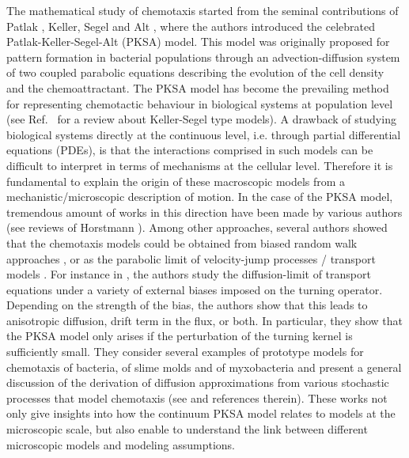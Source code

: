 \documentclass{article}
\begin{document}
{The mathematical study of chemotaxis started from the seminal contributions of Patlak \cite{patlak1953random}, Keller, Segel and Alt \cite{keller1970initiation,keller1971model,Alt1980}, where the authors introduced the celebrated Patlak-Keller-Segel-Alt (PKSA) model. This model was originally proposed for pattern formation in bacterial populations through an advection-diffusion system of two coupled parabolic equations describing the evolution of the cell density and the chemoattractant. The PKSA model has become the prevailing method for representing chemotactic behaviour in biological systems at population level (see Ref.~\cite{Hillen2009} for a review about Keller-Segel type models). A drawback of studying biological systems directly at the continuous level, i.e. through partial differential equations (PDEs), is that the interactions comprised in such models can be difficult to interpret in terms of mechanisms at the cellular level. Therefore it is fundamental to explain the origin of these macroscopic models from a mechanistic/microscopic description of motion. In the case of the PKSA model, tremendous amount of works in this direction have been made by various authors (see reviews of Horstmann \cite{horstmann2003,horstmann2004}). Among other approaches, several authors showed that the chemotaxis models could be obtained from biased random walk approaches \cite{Alt1980, Othmer1997}, or as the parabolic limit of velocity-jump processes / transport models \cite{othmer2000diffusion,othmer2002diffusion,chalub2004kinetic}. For instance in \cite{othmer2002diffusion}, the authors study the diffusion-limit of transport equations under a variety of external biases imposed on the turning operator. Depending on the strength of the bias, the authors show that this leads to anisotropic diffusion, drift term in the flux, or both. In particular, they show that the PKSA model only arises if the perturbation of the turning kernel is sufficiently small. They consider several examples of prototype models for chemotaxis of bacteria, of slime molds and of myxobacteria and present a general discussion of the derivation of diffusion approximations from various stochastic processes that model chemotaxis (see \cite{othmer2000diffusion} and references therein). These works not only give insights into how the continuum PKSA model relates to models at the microscopic scale, but also enable to understand the link between different microscopic models and modeling assumptions.

}
\end{document}
